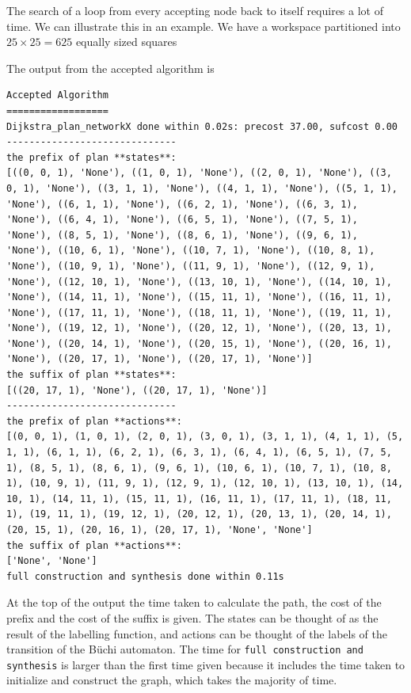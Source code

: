 The search of a loop from every accepting node back to itself requires a lot of time. We can illustrate this in an example. We have a workspace partitioned into $25 \times 25 = 625$ equally sized squares



The output from the accepted algorithm is
\begin{lstlisting}
Accepted Algorithm
==================
Dijkstra_plan_networkX done within 0.02s: precost 37.00, sufcost 0.00
------------------------------
the prefix of plan **states**:
[((0, 0, 1), 'None'), ((1, 0, 1), 'None'), ((2, 0, 1), 'None'), ((3, 0, 1), 'None'), ((3, 1, 1), 'None'), ((4, 1, 1), 'None'), ((5, 1, 1), 'None'), ((6, 1, 1), 'None'), ((6, 2, 1), 'None'), ((6, 3, 1), 'None'), ((6, 4, 1), 'None'), ((6, 5, 1), 'None'), ((7, 5, 1), 'None'), ((8, 5, 1), 'None'), ((8, 6, 1), 'None'), ((9, 6, 1), 'None'), ((10, 6, 1), 'None'), ((10, 7, 1), 'None'), ((10, 8, 1), 'None'), ((10, 9, 1), 'None'), ((11, 9, 1), 'None'), ((12, 9, 1), 'None'), ((12, 10, 1), 'None'), ((13, 10, 1), 'None'), ((14, 10, 1), 'None'), ((14, 11, 1), 'None'), ((15, 11, 1), 'None'), ((16, 11, 1), 'None'), ((17, 11, 1), 'None'), ((18, 11, 1), 'None'), ((19, 11, 1), 'None'), ((19, 12, 1), 'None'), ((20, 12, 1), 'None'), ((20, 13, 1), 'None'), ((20, 14, 1), 'None'), ((20, 15, 1), 'None'), ((20, 16, 1), 'None'), ((20, 17, 1), 'None'), ((20, 17, 1), 'None')]
the suffix of plan **states**:
[((20, 17, 1), 'None'), ((20, 17, 1), 'None')]
------------------------------
the prefix of plan **actions**:
[(0, 0, 1), (1, 0, 1), (2, 0, 1), (3, 0, 1), (3, 1, 1), (4, 1, 1), (5, 1, 1), (6, 1, 1), (6, 2, 1), (6, 3, 1), (6, 4, 1), (6, 5, 1), (7, 5, 1), (8, 5, 1), (8, 6, 1), (9, 6, 1), (10, 6, 1), (10, 7, 1), (10, 8, 1), (10, 9, 1), (11, 9, 1), (12, 9, 1), (12, 10, 1), (13, 10, 1), (14, 10, 1), (14, 11, 1), (15, 11, 1), (16, 11, 1), (17, 11, 1), (18, 11, 1), (19, 11, 1), (19, 12, 1), (20, 12, 1), (20, 13, 1), (20, 14, 1), (20, 15, 1), (20, 16, 1), (20, 17, 1), 'None', 'None']
the suffix of plan **actions**:
['None', 'None']
full construction and synthesis done within 0.11s
\end{lstlisting}

At the top of the output the time taken to calculate the path, the cost of the prefix and the cost of the suffix is given. The states can be thought of as the result of the labelling function, and actions can be thought of the labels of the transition of the B\"uchi automaton. The time for \texttt{full construction and synthesis} is larger than the first time given because it includes the time taken to initialize and construct the graph, which takes the majority of time.

